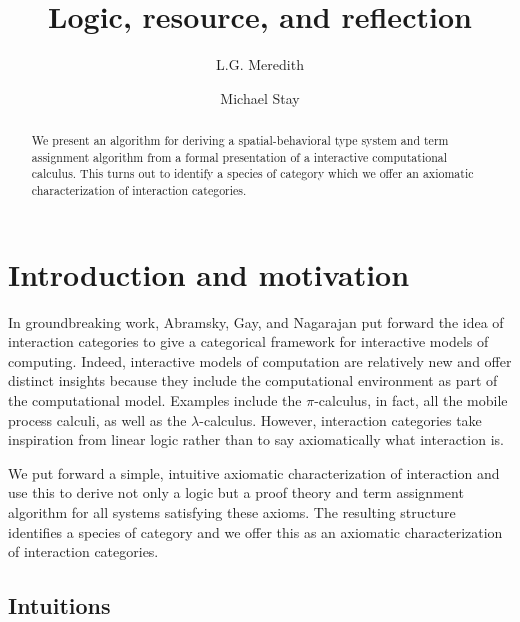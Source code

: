 \documentclass{llncs}
\title{Logic, resource, and reflection}
\author{
L.G. Meredith\inst{1}\\
\and
Michael Stay\inst{2}\\
}
\institute{
  {RChain Cooperative}\\
  \email{\fontsize{8}{8}\selectfont lgreg.meredith@rchain.coop}
  \and
  {Pyrofex Corp.}\\
  \email{\fontsize{8}{8}\selectfont stay@pyrofex.net}\\
}
\renewcommand{\:}{\colon}
\newcommand{\pic}{$\pi$-calculus}
\newcommand{\lamc}{$\lambda$-calculus}
\begin{document}
\maketitle
\begin{abstract}
\noindent
  We present an algorithm for deriving a spatial-behavioral type
  system and term assignment algorithm from a formal presentation of a
  interactive computational calculus. This turns out to identify a
  species of category which we offer an axiomatic characterization of
  interaction categories. 
\end{abstract}


\section{Introduction and motivation}

In groundbreaking work, Abramsky, Gay, and Nagarajan put forward the
idea of interaction categories to give a categorical framework for
interactive models of computing.\cite{DBLP:conf/nato/AbramskyGN96}
Indeed, interactive models of computation are relatively new and offer
distinct insights because they include the computational environment
as part of the computational model. Examples include the {\pic}, in
fact, all the mobile process calculi, as well as the
{\lamc}. \cite{milner91polyadicpi}\cite{Barendregt84} However,
interaction categories take inspiration from linear logic rather than
to say axiomatically what interaction is.

We put forward a simple, intuitive axiomatic characterization of
interaction and use this to derive not only a logic but a proof theory
and term assignment algorithm for all systems satisfying these
axioms. The resulting structure identifies a species of category and
we offer this as an axiomatic characterization of interaction
categories.

\subsection{Intuitions}
\end{document}
